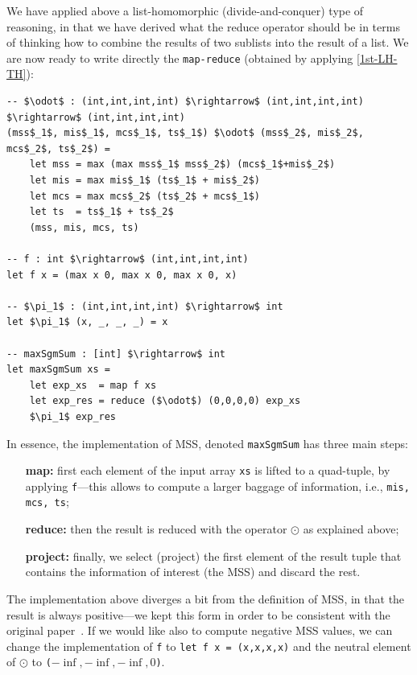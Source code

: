 \documentclass[acmsmall,review]{acmart}\settopmatter{printfolios=true,printccs=false,printacmref=false}
\begin{document}
We have applied above a list-homomorphic (divide-and-conquer) type of
reasoning, in that we have derived what the reduce operator should be
in terms of thinking how to combine the results of two sublists into
the result of a list. We are now ready to write directly the
\lstinline{map-reduce} (obtained by applying \cref{1st-LH-TH}):

\begin{lstlisting}[mathescape=true]
-- $\odot$ : (int,int,int,int) $\rightarrow$ (int,int,int,int) $\rightarrow$ (int,int,int,int)
(mss$_1$, mis$_1$, mcs$_1$, ts$_1$) $\odot$ (mss$_2$, mis$_2$, mcs$_2$, ts$_2$) =
    let mss = max (max mss$_1$ mss$_2$) (mcs$_1$+mis$_2$)
    let mis = max mis$_1$ (ts$_1$ + mis$_2$)
    let mcs = max mcs$_2$ (ts$_2$ + mcs$_1$)
    let ts  = ts$_1$ + ts$_2$
    (mss, mis, mcs, ts)

-- f : int $\rightarrow$ (int,int,int,int)
let f x = (max x 0, max x 0, max x 0, x)

-- $\pi_1$ : (int,int,int,int) $\rightarrow$ int
let $\pi_1$ (x, _, _, _) = x

-- maxSgmSum : [int] $\rightarrow$ int
let maxSgmSum xs = 
    let exp_xs  = map f xs
    let exp_res = reduce ($\odot$) (0,0,0,0) exp_xs
    $\pi_1$ exp_res 
\end{lstlisting}\vspace{-2ex}

In essence, the implementation of MSS, denoted {\tt maxSgmSum} 
has three main steps:
\begin{itemize}
    \item[\bf{map:}] first each element of the input array {\tt xs} is lifted
            to a quad-tuple, by applying {\tt f}---this allows to compute a
            larger baggage of information, i.e., {\tt mis, mcs, ts};
    \item[\bf{reduce:}] then the result is reduced with the operator $\odot$
            as explained above;
    \item[\bf{project:}] finally, we select (project) the first element of
            the result tuple that contains the information of interest (the MSS)
            and discard the rest.
\end{itemize}

The implementation above diverges a bit from the definition of MSS,
in that the result is always positive---we kept this form in order 
to be consistent with the original paper~\cite{ColeNearHom}.  If
we would like also to compute negative MSS values, we can change
the implementation of {\tt f} to
\lstinline{let f x = (x,x,x,x)} and the neutral element of $\odot$
to {\tt($-\inf, -\inf, -\inf, 0$)}.
\end{document}
